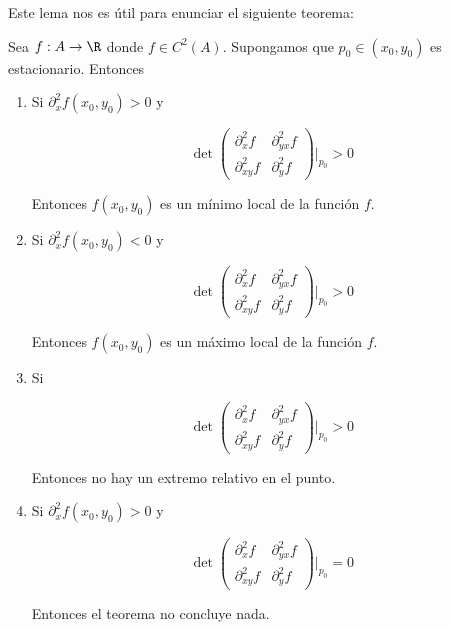 Este lema nos es útil para enunciar el siguiente teorema:

\begin{teo}
    Sea $f: A \rightarrow \R$ donde $f \in C^2(A)$. Supongamos que $p_0 \in (x_0, y_0)$ es estacionario. Entonces
    
    \begin{enumerate}
        \item Si $\partial_x^2 f(x_0, y_0) > 0$ y 
        
        \[
        \det \begin{pmatrix}
                 \partial_x^2f    & \partial_{yx}^2f \\
                 \partial_{xy}^2f & \partial_y^2f
             \end{pmatrix}
             \Biggr\rvert_{p_0}
        > 0
        \]
        
        Entonces $f(x_0, y_0)$ es un mínimo local de la función $f$.
        
        \item Si $\partial_x^2 f(x_0, y_0) < 0$ y 
        
        \[
        \det \begin{pmatrix}
                 \partial_x^2f    & \partial_{yx}^2f \\
                 \partial_{xy}^2f & \partial_y^2f
             \end{pmatrix}
             \Biggr\rvert_{p_0}
        > 0
        \]
        
        Entonces $f(x_0, y_0)$ es un máximo local de la función $f$.
        
        \item Si
        
        \[
        \det \begin{pmatrix}
                 \partial_x^2f    & \partial_{yx}^2f \\
                 \partial_{xy}^2f & \partial_y^2f
             \end{pmatrix}
             \Biggr\rvert_{p_0}
        > 0
        \]
        
        Entonces no hay un extremo relativo en el punto.
        
        \item Si $\partial_x^2 f(x_0, y_0) > 0$ y 
        
        \[
        \det \begin{pmatrix}
                 \partial_x^2f    & \partial_{yx}^2f \\
                 \partial_{xy}^2f & \partial_y^2f
             \end{pmatrix}
             \Biggr\rvert_{p_0}
        = 0
        \]
        
        Entonces el teorema no concluye nada.
    \end{enumerate}
\end{teo}


